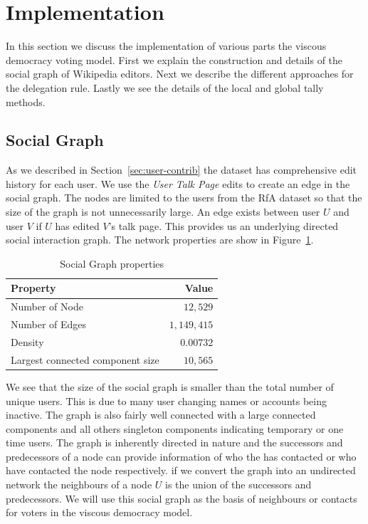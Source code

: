 \section{Implementation}
\label{sec:implementation}
In this section we discuss the implementation of various parts the viscous democracy voting model. First we explain the construction and details of the social graph of Wikipedia editors. Next we describe the different approaches for the delegation rule. Lastly we see the details of the local and global tally methods.

\subsection{Social Graph}
As we described in Section~\ref{sec:user-contrib} the \usercontrib dataset has comprehensive edit history for each user. We use the \textit{User Talk Page} edits to create an edge in the social graph. The nodes are limited to the users from the  RfA dataset so that the size of the graph is not unnecessarily large. An edge exists between user $U$ and user $V$ if $U$ has edited $V$'s talk page. This provides us an underlying directed social interaction graph. The network properties are show in Figure~\ref{tab:social-graph}.

\begin{table}
    \centering
    \begin{tabular}{lr}
        \toprule
        \textbf{Property}& \textbf{Value} \\
        \midrule
        Number of Node & $12,529$ \\
        Number of Edges & $1,149,415$ \\
        Density & $0.00732$\\
        Largest connected component size &$10,565$\\
        \bottomrule
    \end{tabular}
    \caption{Social Graph properties}
    \label{tab:social-graph}
\end{table}

We see that the size of the social graph is smaller than the total number of unique users. This is due to many user changing names or accounts being inactive. The graph is also fairly well connected with a large connected components and all others singleton components indicating temporary or one time users. The graph is inherently directed in nature and the successors and predecessors of a node can provide information of who the has contacted or who have contacted the node respectively. if we convert the graph into an undirected network the neighbours of a node $U$ is the union of the successors and predecessors. We will use this social graph as the basis of neighbours or contacts for voters in the viscous democracy model.

